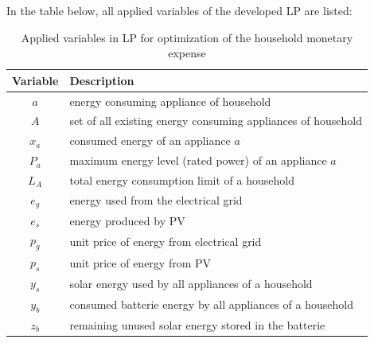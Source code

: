 \clearpage
In the table below, all applied variables of the developed LP are listed:

\begin{longtable}{c|l}
	\caption{Applied variables in LP for optimization of the household monetary expense} 
	\label{table:applied_variables_lp} 
	\\
	\textbf{Variable} & \textbf{Description} \\
	\hline
    $a$ & energy consuming appliance of household \\
	$A$ & set of all existing energy consuming appliances of household \\
	$x_{a}$ & consumed energy of an appliance $a$ \\
	$P_{a}$ & maximum energy level (rated power) of an appliance $a$ \\
	$L_{A}$ & total energy consumption limit of a household \\
	$e_{g}$ & energy used from the electrical grid \\
	$e_{s}$ & energy produced by PV \\
	$p_{g}$ & unit price of energy from electrical grid \\
	$p_{s}$ & unit price of energy from PV \\
	$y_{s}$ & solar energy used by all appliances of a household \\
	$y_{b}$ & consumed batterie energy by all appliances of a household \\
	$z_{b}$ & remaining unused solar energy stored in the batterie \\
\end{longtable} 


